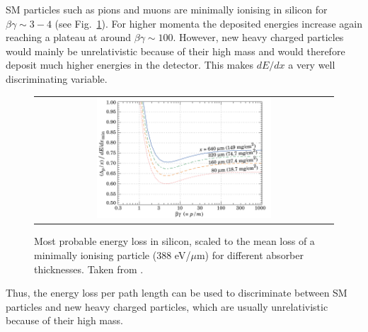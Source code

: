SM particles such as pions and muons are minimally ionising in silicon for $\beta\gamma \sim 3-4$ (see Fig.~\ref{fig:dEdx_Landau_Silicon}). 
For higher momenta the deposited energies increase again reaching a plateau at around $\beta\gamma\sim100$. 
However, new heavy charged particles would mainly be unrelativistic because of their high mass and would therefore deposit much higher energies in the detector.
This makes $dE/dx$  a very well discriminating variable.
\begin{figure}[!b]
  \centering 
  \begin{tabular}{c}
  \includegraphics[width=0.6\textwidth]{figures/analysis/dEdx_Landau_Silicon.png}
  \end{tabular}
  \caption{Most probable energy loss in silicon, scaled to the mean loss of a minimally ionising particle (388 eV/$\mu$m) for different absorber thicknesses. Taken from \cite{bib:PDG_2014}.} 
  \label{fig:dEdx_Landau_Silicon}
\end{figure}
Thus, the energy loss per path length can be used to discriminate between SM particles and new heavy charged particles, which are usually unrelativistic because of their high mass.

